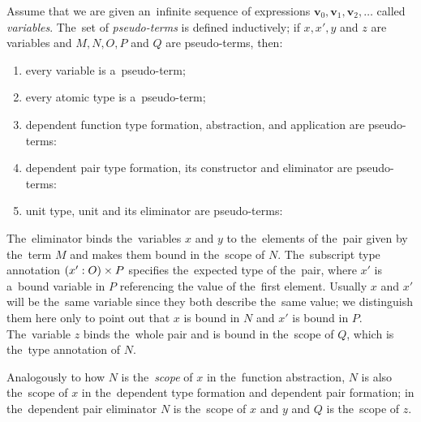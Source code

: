 \begin{definition}\label{def:pseudo-term}
  Assume that we are given an~infinite sequence of expressions $\mathbf{v}_0,
  \mathbf{v}_1, \mathbf{v}_2, \dots$ called \emph{variables}. The~set of
  \emph{pseudo-terms} is defined inductively; if $x, x', y$ and $z$ are
  variables and $M, N, O, P$ and $Q$ are pseudo-terms, then:
  \begin{enumerate}
    \item every variable is a~pseudo-term;
    \item every atomic type is a~pseudo-term;
    \item dependent function type formation, abstraction, and application
      are pseudo-terms:
    \item dependent pair type formation, its constructor and eliminator are
      pseudo-terms:
    \item unit type, unit and its eliminator are pseudo-terms:
  \end{enumerate}
\end{definition}
The~eliminator binds the~variables $x$ and $y$ to the~elements of the~pair given
by the~term $M$ and makes them bound in the~scope of $N$. The~subscript type
annotation $(x' \overset{}: O)\times P$ specifies the~expected type of the~pair, where
$x'$ is a~bound variable in $P$ referencing the value of the~first element.
Usually $x$ and $x'$ will be the~same variable since they both describe the~same
value; we distinguish them here only to point out that $x$ is bound in $N$ and
$x'$ is bound in $P$. The~variable $z$ binds the~whole pair and is bound in
the~scope of $Q$, which is the~type annotation of $N$.

Analogously to how $N$ is the~\emph{scope} of $x$ in the~function abstraction,
$N$ is also the~scope of $x$ in the~dependent type formation and dependent pair
formation; in the~dependent pair eliminator $N$ is the~scope of $x$ and $y$ and
$Q$ is the~scope of $z$.

